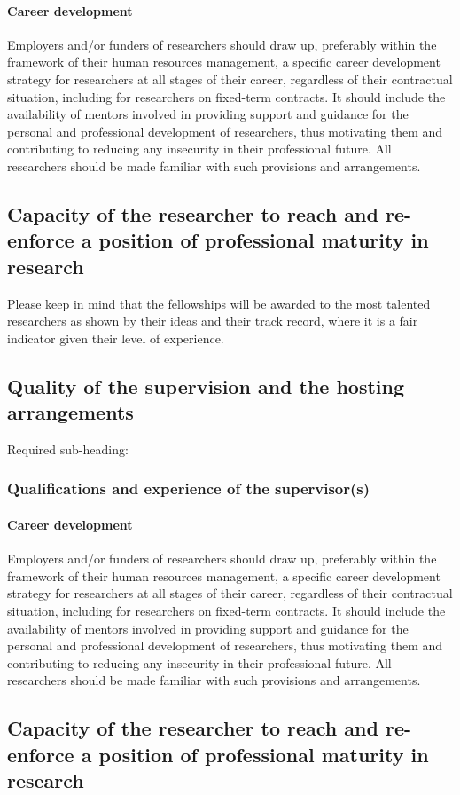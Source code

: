 \paragraph{Career development}
Employers and/or funders of researchers should draw up, preferably within the framework of their human resources management, a specific career development strategy for researchers at all stages of their career, regardless of their contractual situation, including for researchers on fixed-term contracts. It should include the availability of mentors involved in providing support and guidance for the personal and professional development of researchers, thus motivating them and contributing to reducing any insecurity in their professional future. All researchers should be made familiar with such provisions and arrangements.

\subsection{Capacity of the researcher to reach and re-enforce a position of professional maturity in research}
\label{sec:maturity}

Please keep in mind that the fellowships will be awarded to the most talented researchers as shown by their ideas and their track record, where it is a fair indicator given their level of experience.
\subsection{Quality of the supervision and the hosting arrangements}
\label{sec:supervision}

Required sub-heading:
\subsubsection*{Qualifications and experience of the supervisor(s)}


\paragraph{Career development}
Employers and/or funders of researchers should draw up, preferably within the framework of their human resources management, a specific career development strategy for researchers at all stages of their career, regardless of their contractual situation, including for researchers on fixed-term contracts. It should include the availability of mentors involved in providing support and guidance for the personal and professional development of researchers, thus motivating them and contributing to reducing any insecurity in their professional future. All researchers should be made familiar with such provisions and arrangements.

\subsection{Capacity of the researcher to reach and re-enforce a position of professional maturity in research}
\label{sec:maturity}

